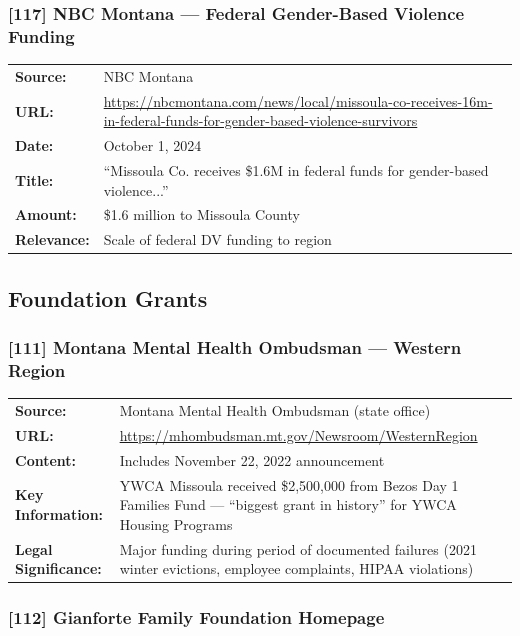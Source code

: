 \documentclass[11pt,letterpaper]{article}
\newcommand{\citeref}[1]{\textbf{\color{NavyBlue}[#1]}}
\begin{document}
\subsubsection{\citeref{117} NBC Montana --- Federal Gender-Based Violence Funding}

\begin{tabular}{@{}p{1.4in}p{4.6in}@{}}
\textbf{Source:} & NBC Montana\\
\textbf{URL:} & \url{https://nbcmontana.com/news/local/missoula-co-receives-16m-in-federal-funds-for-gender-based-violence-survivors}\\
\textbf{Date:} & October 1, 2024\\
\textbf{Title:} & ``Missoula Co. receives \$1.6M in federal funds for gender-based violence...''\\
\textbf{Amount:} & \$1.6 million to Missoula County\\
\textbf{Relevance:} & Scale of federal DV funding to region\\
\end{tabular}

\subsection{Foundation Grants}

\subsubsection{\citeref{111} Montana Mental Health Ombudsman --- Western Region}

\begin{tabular}{@{}p{1.4in}p{4.6in}@{}}
\textbf{Source:} & Montana Mental Health Ombudsman (state office)\\
\textbf{URL:} & \url{https://mhombudsman.mt.gov/Newsroom/WesternRegion}\\
\textbf{Content:} & Includes November 22, 2022 announcement\\
\textbf{Key Information:} & YWCA Missoula received \$2,500,000 from Bezos Day 1 Families Fund --- ``biggest grant in history'' for YWCA Housing Programs\\
\textbf{Legal Significance:} & Major funding during period of documented failures (2021 winter evictions, employee complaints, HIPAA violations)\\
\end{tabular}

\subsubsection{\citeref{112} Gianforte Family Foundation Homepage}
\end{document}
